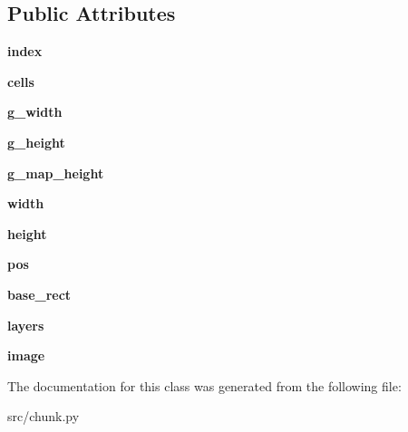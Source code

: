 \subsection*{\-Public \-Attributes}
\begin{DoxyCompactItemize}
\item 
\hypertarget{classsrc_1_1chunk_1_1_chunk_a82ce0dfa8735315e26aa9c2416a1990f}{{\bfseries index}}\label{classsrc_1_1chunk_1_1_chunk_a82ce0dfa8735315e26aa9c2416a1990f}

\item 
\hypertarget{classsrc_1_1chunk_1_1_chunk_ae7460fc09ed78a35073fcbee362fd632}{{\bfseries cells}}\label{classsrc_1_1chunk_1_1_chunk_ae7460fc09ed78a35073fcbee362fd632}

\item 
\hypertarget{classsrc_1_1chunk_1_1_chunk_aaa7585d6dbe7279632c09e63f01b1852}{{\bfseries g\-\_\-width}}\label{classsrc_1_1chunk_1_1_chunk_aaa7585d6dbe7279632c09e63f01b1852}

\item 
\hypertarget{classsrc_1_1chunk_1_1_chunk_a1983fca8cce8b602d5f913af22f560f3}{{\bfseries g\-\_\-height}}\label{classsrc_1_1chunk_1_1_chunk_a1983fca8cce8b602d5f913af22f560f3}

\item 
\hypertarget{classsrc_1_1chunk_1_1_chunk_a45d01aeba780db57436699c0bfa539cb}{{\bfseries g\-\_\-map\-\_\-height}}\label{classsrc_1_1chunk_1_1_chunk_a45d01aeba780db57436699c0bfa539cb}

\item 
\hypertarget{classsrc_1_1chunk_1_1_chunk_a5e22e44a7517d38933823b944e467056}{{\bfseries width}}\label{classsrc_1_1chunk_1_1_chunk_a5e22e44a7517d38933823b944e467056}

\item 
\hypertarget{classsrc_1_1chunk_1_1_chunk_a6935c2e39e08c5d5855c87e5cc3fb624}{{\bfseries height}}\label{classsrc_1_1chunk_1_1_chunk_a6935c2e39e08c5d5855c87e5cc3fb624}

\item 
\hypertarget{classsrc_1_1chunk_1_1_chunk_a2d4bb7df9b98984ad3f37988d821dc04}{{\bfseries pos}}\label{classsrc_1_1chunk_1_1_chunk_a2d4bb7df9b98984ad3f37988d821dc04}

\item 
\hypertarget{classsrc_1_1chunk_1_1_chunk_abccabd7f23455a148a3f29f4c5e9dbcd}{{\bfseries base\-\_\-rect}}\label{classsrc_1_1chunk_1_1_chunk_abccabd7f23455a148a3f29f4c5e9dbcd}

\item 
\hypertarget{classsrc_1_1chunk_1_1_chunk_a015e548635e3c3f6b43640852e24a609}{{\bfseries layers}}\label{classsrc_1_1chunk_1_1_chunk_a015e548635e3c3f6b43640852e24a609}

\item 
\hypertarget{classsrc_1_1chunk_1_1_chunk_a6044859819fd7699a93d453c52c16552}{{\bfseries image}}\label{classsrc_1_1chunk_1_1_chunk_a6044859819fd7699a93d453c52c16552}

\end{DoxyCompactItemize}


\-The documentation for this class was generated from the following file\-:\begin{DoxyCompactItemize}
\item 
src/chunk.\-py\end{DoxyCompactItemize}
